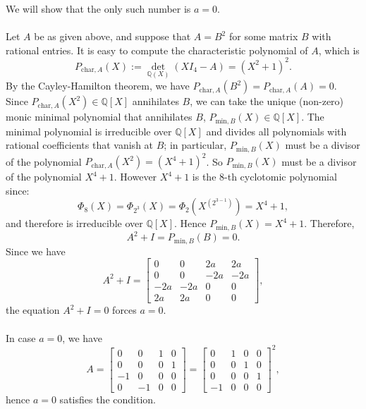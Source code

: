 \begin{solution}
    We will show that the only such number is \( a = 0 \).
    \\\\
    Let \( A \) be as given above, and suppose that \( A = B^2 \) for some matrix \( B \) with rational entries. It is easy to compute the characteristic polynomial of \( A \), which is
    \[
        P_{\text{char},A}\left(X\right) := {\det}_{\mathbb{Q}\left(X\right)}\left(XI_4-A\right) = \left(X^2 + 1\right)^2.
    \]
    By the Cayley-Hamilton theorem, we have \( P_{\text{char},A}\left(B^2\right) = P_{\text{char},A}\left(A\right) = 0 \). Since \( P_{\text{char},A}\left(X^2\right)\in\mathbb{Q}\left[X\right] \) annihilates \( B \), we can take the unique (non-zero) monic minimal polynomial that annihilates \( B \), \( P_{\text{min},B}\left(X\right)\in\mathbb{Q}\left[X\right] \). The minimal polynomial is irreducible over \( \mathbb{Q}\left[X\right] \) and divides all polynomials with rational coefficients that vanish at \( B \); in particular, \( P_{\text{min},B}\left(X\right) \) must be a divisor of the polynomial \( P_{\text{char},A}\left(X^2\right) = \left(X^4 + 1\right)^2 \). So \( P_{\text{min},B}\left(X\right) \) must be a divisor of the polynomial \( X^4 + 1 \). However \( X^4 + 1 \) is the \( 8 \)-th cyclotomic polynomial since:
    \[
        \Phi_{8}\left(X\right)=\Phi_{2^3}\left(X\right)=\Phi_{2}\left(X^{\left(2^{3-1}\right)}\right)=X^4+1,
    \]
    and therefore is irreducible over \( \mathbb{Q}\left[X\right] \). Hence \( P_{\text{min},B}\left(X\right)= X^4+1 \). Therefore,
    \[
        A^2 + I = P_{\text{min},B}\left(B\right) = 0.
    \]
    Since we have
    \[
        A^2 + I = \begin{bmatrix}
            0 & 0 & 2a & 2a \\
            0 & 0 & -2a & -2a \\
            -2a & -2a & 0 & 0 \\
            2a & 2a & 0 & 0
        \end{bmatrix},
    \]
    the equation \( A^2 + I = 0 \) forces \( a = 0 \).
    \\\\
    In case \( a = 0 \), we have
    \[
        A = \begin{bmatrix}
            0 & 0 & 1 & 0 \\
            0 & 0 & 0 & 1 \\
            -1 & 0 & 0 & 0 \\
            0 & -1 & 0 & 0
        \end{bmatrix} = \begin{bmatrix}
            0 & 1 & 0 & 0 \\
            0 & 0 & 1 & 0 \\
            0 & 0 & 0 & 1 \\
            -1 & 0 & 0 & 0
        \end{bmatrix}^2,
    \]
    hence \( a = 0 \) satisfies the condition.
\end{solution}
